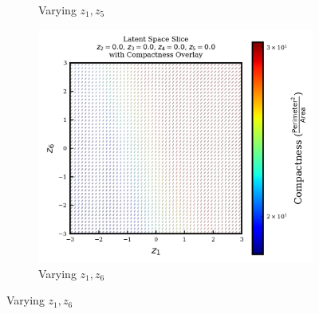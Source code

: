 \documentclass{article}
\begin{document}
\begin{figure}[H]
\begin{subfigure}{0.3\textwidth}
        \caption{Varying $z_1, z_5$}
    \end{subfigure}
    \hfill
    \begin{subfigure}{0.3\textwidth}
        \includegraphics[width=\linewidth]{figures/VAEmodels/model5/varying_z1_z6_fixed_z2=0.0_z3=0.0_z4=0.0_z5=0.0.png}
        \caption{Varying $z_1, z_6$}
    \end{subfigure}


\end{figure}
\end{document}
